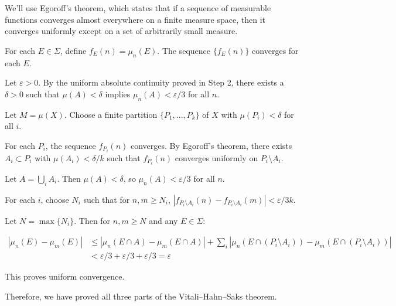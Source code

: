 \documentclass{article}
\begin{document}
We'll use Egoroff's theorem, which states that if a sequence of measurable
functions converges almost everywhere on a finite measure space, then it
converges uniformly except on a set of arbitrarily small measure.

For each $E \in \Sigma$, define $f_E (n) = \mu_n (E)$. The sequence $\{f_E
(n)\}$ converges for each $E$.

Let $\varepsilon > 0$. By the uniform absolute continuity proved in Step 2,
there exists a $\delta > 0$ such that $\mu (A) < \delta$ implies $\mu_n (A) <
\varepsilon / 3$ for all $n$.

Let $M = \mu (X)$. Choose a finite partition $\{P_1, ..., P_k \}$ of $X$ with
$\mu (P_i) < \delta$ for all $i$.

For each $P_i$, the sequence $f_{P_i} (n)$ converges. By Egoroff's theorem,
there exists $A_i \subset P_i$ with $\mu (A_i) < \delta / k$ such that
$f_{P_i} (n)$ converges uniformly on $P_i \setminus A_i$.

Let $A = \bigcup_i A_i$. Then $\mu (A) < \delta$, so $\mu_n (A) < \varepsilon
/ 3$ for all $n$.

For each $i$, choose $N_i$ such that for $n, m \geq N_i$, $|f_{P_i \setminus
A_i} (n) - f_{P_i \setminus A_i} (m) | < \varepsilon / 3 k$.

Let $N = \max \{N_i \}$. Then for $n, m \geq N$ and any $E \in \Sigma$:

\begin{align*}
  | \mu_n (E) - \mu_m (E) | & \leq | \mu_n (E \cap A) - \mu_m (E \cap A) | +
  \sum_i | \mu_n (E \cap (P_i \setminus A_i)) - \mu_m (E \cap (P_i \setminus
  A_i)) |\\
  & < \varepsilon / 3 + \varepsilon / 3 + \varepsilon / 3 = \varepsilon
\end{align*}

This proves uniform convergence.

Therefore, we have proved all three parts of the Vitali--Hahn--Saks theorem.
\end{document}
